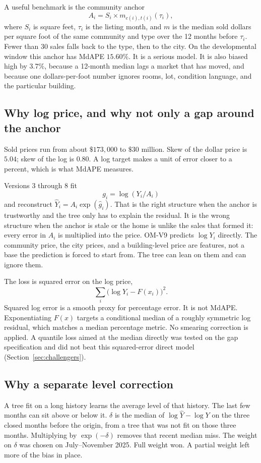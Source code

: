 \documentclass[11pt]{article}
\newcommand{\modelid}{OM-V9}
\begin{document}
A useful benchmark is the community anchor
\[
A_i = S_i \times m_{c(i), t(i)}(\tau_i),
\]
where \(S_i\) is square feet, \(\tau_i\) is the listing month, and \(m\) is the median sold dollars per square foot of the same community and type over the 12 months before \(\tau_i\). Fewer than 30 sales falls back to the type, then to the city. On the developmental window this anchor has MdAPE \(15.60\%\). It is a serious model. It is also biased high by \(3.7\%\), because a 12-month median lags a market that has moved, and because one dollars-per-foot number ignores rooms, lot, condition language, and the particular building.

\subsection{Why log price, and why not only a gap around the anchor}

Sold prices run from about \(\$173{,}000\) to \(\$30\) million. Skew of the dollar price is \(5.04\); skew of the log is \(0.80\). A log target makes a unit of error closer to a percent, which is what MdAPE measures.

Versions 3 through 8 fit
\[
g_i = \log(Y_i / A_i)
\]
and reconstruct \(\hat Y_i = A_i \exp(\hat g_i)\). That is the right structure when the anchor is trustworthy and the tree only has to explain the residual. It is the wrong structure when the anchor is stale or the home is unlike the sales that formed it: every error in \(A_i\) is multiplied into the price. \modelid{} predicts \(\log Y_i\) directly. The community price, the city prices, and a building-level price are features, not a base the prediction is forced to start from. The tree can lean on them and can ignore them.

The loss is squared error on the log price,
\[
\sum_i \bigl(\log Y_i - F(x_i)\bigr)^2.
\]
Squared log error is a smooth proxy for percentage error. It is not MdAPE. Exponentiating \(F(x)\) targets a conditional median of a roughly symmetric log residual, which matches a median percentage metric. No smearing correction is applied. A quantile loss aimed at the median directly was tested on the gap specification and did not beat this squared-error direct model (Section~\ref{sec:challengers}).

\subsection{Why a separate level correction}

A tree fit on a long history learns the average level of that history. The last few months can sit above or below it. \(\delta\) is the median of \(\log\hat Y - \log Y\) on the three closed months before the origin, from a tree that was not fit on those three months. Multiplying by \(\exp(-\delta)\) removes that recent median miss. The weight on \(\delta\) was chosen on July--November 2025. Full weight won. A partial weight left more of the bias in place.
\end{document}
